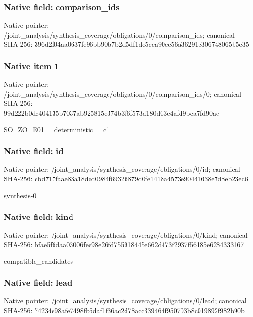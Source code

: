 \documentclass[10pt,a4paper]{article}
\begin{document}
\subsubsection{Native field: comparison\_\allowbreak{}ids}
Native pointer: /joint\_\allowbreak{}analysis/synthesis\_\allowbreak{}coverage/obligations/0/comparison\_\allowbreak{}ids; canonical SHA-256: 396d2f04aa0637fe96bb90b7b2d5df1de5cca90ec56a36291e306748065b5e35

\subsubsection{Native item 1}
Native pointer: /joint\_\allowbreak{}analysis/synthesis\_\allowbreak{}coverage/obligations/0/comparison\_\allowbreak{}ids/0; canonical SHA-256: 99d222b0dc404135b7037ab925815e374b3f6f573d180d03e4afd9bca7fd90ae

\begingroup\raggedright\sloppy SO\_\allowbreak{}ZO\_\allowbreak{}E01\_\allowbreak{}\_\allowbreak{}deterministic\_\allowbreak{}\_\allowbreak{}c1\par\endgroup

\subsubsection{Native field: id}
Native pointer: /joint\_\allowbreak{}analysis/synthesis\_\allowbreak{}coverage/obligations/0/id; canonical SHA-256: cbd717faae83a18dcd0984f69326879d0fe1418a4573e90441638e7d8eb23ec6

\begingroup\raggedright\sloppy synthesis-0\par\endgroup

\subsubsection{Native field: kind}
Native pointer: /joint\_\allowbreak{}analysis/synthesis\_\allowbreak{}coverage/obligations/0/kind; canonical SHA-256: bfae5f6daa03006fec98e26fd755918445e662d473f2937f56185e6284333167

\begingroup\raggedright\sloppy compatible\_\allowbreak{}candidates\par\endgroup

\subsubsection{Native field: lead}
Native pointer: /joint\_\allowbreak{}analysis/synthesis\_\allowbreak{}coverage/obligations/0/lead; canonical SHA-256: 74234e98afe7498fb5daf1f36ac2d78acc339464f950703b8c019892f982b90b
\end{document}

